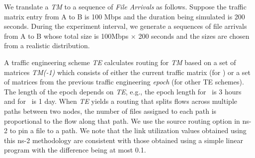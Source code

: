 We translate a \textsl{TM} to a sequence of \textsl{File Arrivals} as follows. Suppose the traffic matrix entry from A to B is 100 Mbps and the duration being simulated is 200 seconds. During the experiment interval, we generate a sequences of file arrivals from A to B whose total size is 100Mbps $\times$ 200 seconds and the sizes are chosen from a realistic distribution.

A traffic engineering scheme \textsl{TE} calculates routing for \textsl{TM} based on a set of matrices \textsl{TM(-1)} which consists of either the current traffic matrix (for \opt) or a set of matrices from the previous traffic engineering {\em epoch} (for other TE schemes). The length of the epoch depends on {\em TE}, e.g., the epoch length for \optwt\  is 3 hours and for \cope\ is 1 day. When \textsl{TE}  yields a routing that splits flows across multiple paths between two nodes, the number of files assigned to each path is proportional to the flow along that path. We use  the source routing option in ns-2 to pin a file to a path. We note that the link utilization values obtained using this ns-2 methodology are consistent with those obtained using a simple linear program with the difference being at most 0.1.







